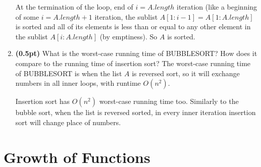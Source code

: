 \documentclass{article}
\begin{document}
\begin{enumerate}[label=\Alph*]
  At the termination of the loop, end of $i = A.length$ iteration (like a beginning of some $i = A.length + 1$ iteration, the sublist $A[1:i - 1] = A[1:A.length]$ is sorted and all of its elements is less than or equal to any other element in the sublist $A[i:A.length]$ (by emptiness). So $A$ is sorted.
  \bigbreak
  \item \textbf{(0.5pt)} What is the worst-case running time of BUBBLESORT? How does it compare to the running time of insertion sort?
  \bigbreak
  The worst-case running time of BUBBLESORT is when the list $A$ is reversed sort, so it will exchange numbers in all inner loops, with runtime $O(n^2)$.
  
  Insertion sort has $O(n^2)$ worst-case running time too. Similarly to the bubble sort, when the list is reversed sorted, in every inner iteration insertion sort will change place of numbers.
\end{enumerate}


\section{Growth of Functions}
\end{document}
